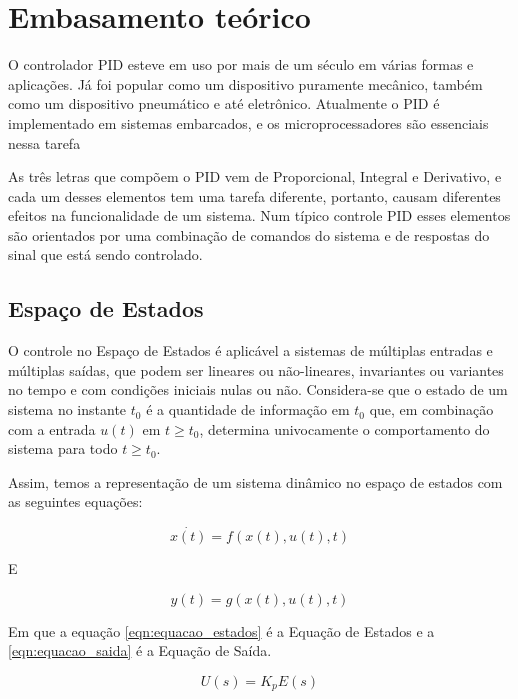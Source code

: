 \documentclass[
	12pt,				%
	openany,			%
	oneside,			%
	a4paper,			%
	english,			%
	french,				%
	spanish,			%
	brazil,				%
	]{abntex2}
\begin{document}
{\chapter{Embasamento teórico}

O controlador PID esteve em uso por mais de um século em várias formas e aplicações. Já foi popular como um dispositivo puramente mecânico, também como um dispositivo pneumático e até eletrônico. Atualmente o PID é implementado em sistemas embarcados, e os microprocessadores são essenciais nessa tarefa \cite{timwescott1}

As três letras que compõem o PID vem de Proporcional, Integral e Derivativo, e cada um desses elementos tem uma tarefa diferente, portanto, causam diferentes efeitos na funcionalidade de um sistema. Num típico controle PID esses elementos são orientados por uma combinação de comandos do sistema e de respostas do sinal que está sendo controlado.


\section{Espaço de Estados}

O controle no Espaço de Estados é aplicável a sistemas de múltiplas entradas e múltiplas saídas, que podem ser lineares ou não-lineares, invariantes ou variantes no tempo e com condições iniciais nulas ou não. Considera-se que o estado de um sistema no instante $t_0$ é a quantidade de informação em $t_0$ que, em combinação com a entrada $u(t)$ em $t \geq t_0$, determina univocamente o comportamento do sistema para todo $t \geq t_0$.

Assim, temos a representação de um sistema dinâmico no espaço de estados com as seguintes equações:

\begin{equation}
	\dot{x(t)} = f(x(t), u(t),t)
	\label{eqn:equacao_estados}
\end{equation}

E

\begin{equation}
	y(t) = g(x(t), u(t),t)
	\label{eqn:equacao_saida}
\end{equation}

Em que a equação \ref{eqn:equacao_estados} é a Equação de Estados e a \ref{eqn:equacao_saida} é a Equação de Saída.

\begin{equation}
U(s) = K_pE(s)
\end{equation}

}
\end{document}
